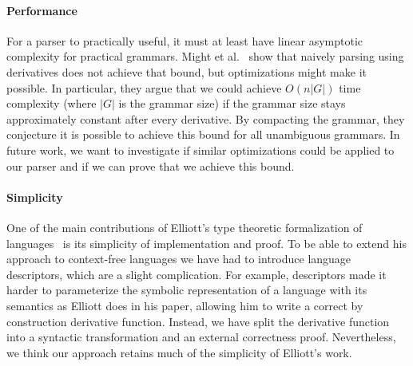\paragraph{Performance} For a parser to practically useful, it must at least have linear asymptotic complexity for practical grammars. Might et al.~\cite{parsing-with-derivatives} show that naively parsing using derivatives does not achieve that bound, but optimizations might make it possible. In particular, they argue that we could achieve $O(n|G|)$ time complexity (where $|G|$ is the grammar size) if the grammar size stays approximately constant after every derivative. By compacting the grammar, they conjecture it is possible to achieve this bound for all unambiguous grammars. In future work, we want to investigate if similar optimizations could be applied to our parser and if we can prove that we achieve this bound.

\paragraph{Simplicity} One of the main contributions of Elliott's type theoretic formalization of languages~\cite{conal-languages} is its simplicity of implementation and proof. To be able to extend his approach to context-free languages we have had to introduce language descriptors, which are a slight complication. For example, descriptors made it harder to parameterize the symbolic representation of a language with its semantics as Elliott does in his paper, allowing him to write a correct by construction derivative function. Instead, we have split the derivative function into a syntactic transformation and an external correctness proof. Nevertheless, we think our approach retains much of the simplicity of Elliott's work.